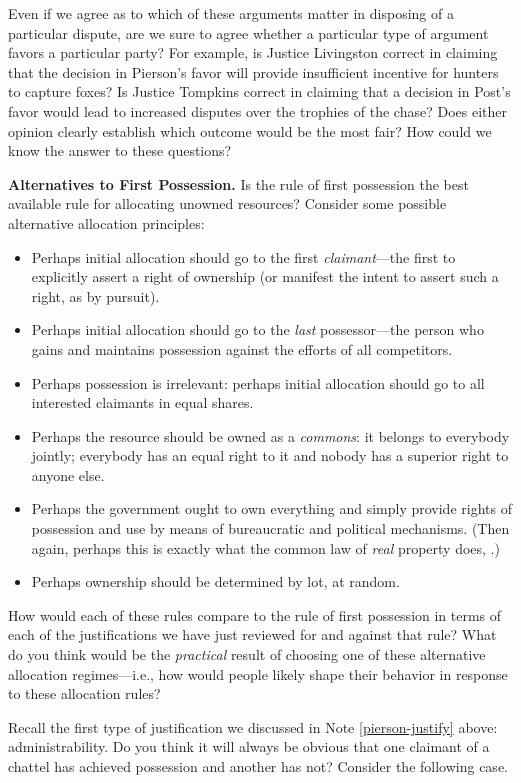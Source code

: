 Even if we agree as to which of these arguments matter in disposing of a
particular dispute, are we sure to agree whether a particular type of argument
favors a particular party? For example, is Justice Livingston correct in
claiming that the decision in Pierson's favor will provide insufficient
incentive for hunters to capture foxes? Is Justice Tompkins correct in claiming
that a decision in Post's favor would lead to increased disputes over the
trophies of the chase? Does either opinion clearly establish which outcome would
be the most fair? How could we know the answer to these questions?

\item \textbf{Alternatives to First Possession.} Is the rule of first possession
the best available rule for allocating unowned resources? Consider some possible
alternative allocation principles: 
\begin{itemize}
\item Perhaps initial allocation should go to the first \textit{claimant}---the
first to explicitly assert a right of ownership (or manifest the intent to
assert such a right, as by pursuit).
\item Perhaps initial allocation should go to the \textit{last} possessor---the
person who gains and maintains possession against the efforts of all
competitors. 
\item Perhaps possession is irrelevant: perhaps initial allocation should go to
all interested claimants in equal shares. 
\item Perhaps the resource should be owned as a \textit{commons}: it belongs to
everybody jointly; everybody has an equal right to it and nobody has a superior
right to anyone else.
\item Perhaps the government ought to own everything and simply provide rights
of possession and use by means of bureaucratic and political mechanisms. (Then
again, perhaps this is exactly what the common law of \textit{real} property
does, .)
\item Perhaps ownership should be determined by lot, at random. 
\end{itemize}
How would each of these rules compare to the rule of first possession in terms
of each of the justifications we have just reviewed for and against that rule?
What do you think would be the \textit{practical} result of choosing one of
these alternative allocation regimes---i.e., how would people likely shape their
behavior in response to these allocation rules?

\item Recall the first type of justification we discussed in Note
\ref{pierson-justify} above:
administrability. Do you think it will always be obvious that one claimant of a
chattel has achieved possession and another has not? Consider the following
case.

